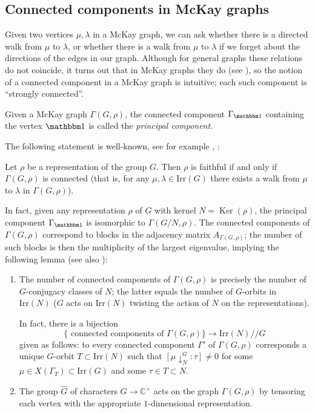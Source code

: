\documentclass[ALCO]{cedram}
\newcommand{\triv}{{\mathbbm 1}}
\newcommand{\Ker}{\operatorname{Ker}}
\newcommand{\C}{{\mathbb C}}
\newcommand{\lam}{{\lambda}}
\begin{document}
\subsection{Connected components in McKay graphs}

Given two vertices $\mu, \lam$ in a McKay graph, we can ask whether there is a directed walk from $\mu$ to $\lam$, or whether there is a walk from $\mu$ to $\lam$ if we forget about the directions of the edges in our graph. Although for general graphs these relations do not coincide, it turns out that in McKay graphs they do (see \cite[Section 3]{Browne}), so the notion of a connected component in a McKay graph is intuitive; each such component is ``strongly connected''.

Given a McKay graph $\Gamma(G, \rho)$, the connected component $\Gamma_{\triv}$ containing the vertex $\triv$ is called the {\it principal component}.

The following statement is well-known, see for example \cite[Proposition 1]{McKay}, \cite[Proposition 3.3]{Browne}:
\begin{lemma}\label{lem:connectivity}
 Let $\rho$ be a representation of the group $G$. Then $\rho$ is faithful if and 
only if $\Gamma(G, \rho)$ is connected (that is, for any $\mu, \lam \in \mathrm{Irr}(G)$ 
there exists a walk from $\mu$ to $\lam$ in $\Gamma(G, \rho)$).
\end{lemma}


In fact, given any representation $\rho$ of $G$ with kernel $N = \Ker(\rho)$, the principal component $\Gamma_{\triv}$ is isomorphic to $\Gamma(G/N, \rho)$. 
The connected components of $\Gamma(G, \rho)$ correspond to blocks in the adjacency matrix $A_{\Gamma(G, \rho)}$; the number of such blocks is then the multiplicity of the largest eigenvalue, implying the following lemma (see also \cite[Proposition 3.10, Lemma 4.1]{Browne}):
\begin{lemma}\label{lem:connected_comp_Browne} 
\mbox{}
 \begin{enumerate}
  \item The number of connected components of $\Gamma(G, \rho)$ is precisely the number of $G$-conjugacy classes of $N$; the latter equals the number of $G$-orbits in $\mathrm{Irr}({N})$ ($G$ acts on $\mathrm{Irr}(N)$ twisting the action of $N$ on the representations).
  
  In fact, there is a bijection
  $$\{\text{ connected components of } \Gamma(G, \rho)\} \longrightarrow \mathrm{Irr}(N)//G$$
  given as follows: to every connected component $\Gamma'$ of $\Gamma(G, \rho)$ corresponds a unique $G$-orbit $T \subset \mathrm{Irr}(N)$ such that $[\mu \downarrow^G_N: \tau] \neq 0$ for some $\mu \in X(\Gamma_T) \subset \mathrm{Irr}(G)$ and some $\tau \in T \subset N$.
  \item The group $\widehat{G}$ of characters $G \to \C^{\times}$ acts on the graph $\Gamma(G, \rho)$ by tensoring each vertex with the appropriate $1$-dimensional representation.
 \end{enumerate}
 
 
\end{lemma}
\end{document}
